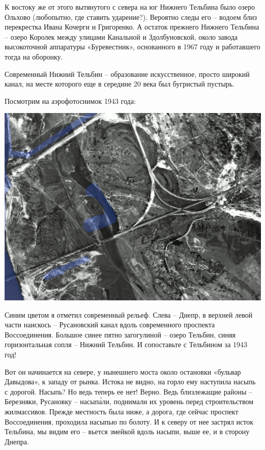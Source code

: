 К востоку же от этого вытянутого с севера на юг Нижнего Тельбина было озеро Ольхово (любопытно, где ставить ударение?). Вероятно следы его – водоем близ перекрестка Ивана Кочерги и Григоренко. А остаток прежнего Нижнего Тельбина – озеро Королек между улицами Канальной и Здолбуновской, около завода высокоточной аппаратуры «Буревестник», основанного в 1967 году и работавшего тогда на оборонку.

Современный Нижний Тельбин – образование искусственное, просто широкий канал, на месте которого еще в середине 20 века был бугристый пустырь.

Посмотрим на аэрофотоснимок 1943 года:

\begin{center}
\includegraphics[width=\linewidth]{chast-gorodki/terbin/s_telbin-1943.jpg}
\end{center}

Синим цветом я отметил современный рельеф. Слева – Днепр, в верхней левой части наискось – Русановский канал вдоль современного проспекта Воссоединения. Большое синее пятно загогулиной – озеро Тельбин, синяя горизонтальная сопля – Нижний Тельбин. И сопоставьте с Тельбином за 1943 год!

Вот он начинается на севере, у нынешнего моста около остановки «бульвар Давыдова», к западу от рынка. Истока не видно, на горло ему наступила насыпь с дорогой. Насыпь? Но ведь теперь ее нет! Верно. Ведь близлежащие районы – Березняки, Русановку – насып\'али, поднимали их уровень перед строительством жилмассивов. Прежде местность была ниже, а дорога, где сейчас проспект Воссоединения, проходила насыпью по болоту. И к северу от нее застрял исток Тельбина, мы видим его – вьется змейкой вдоль насыпи, выше ее, и в сторону Днепра.

